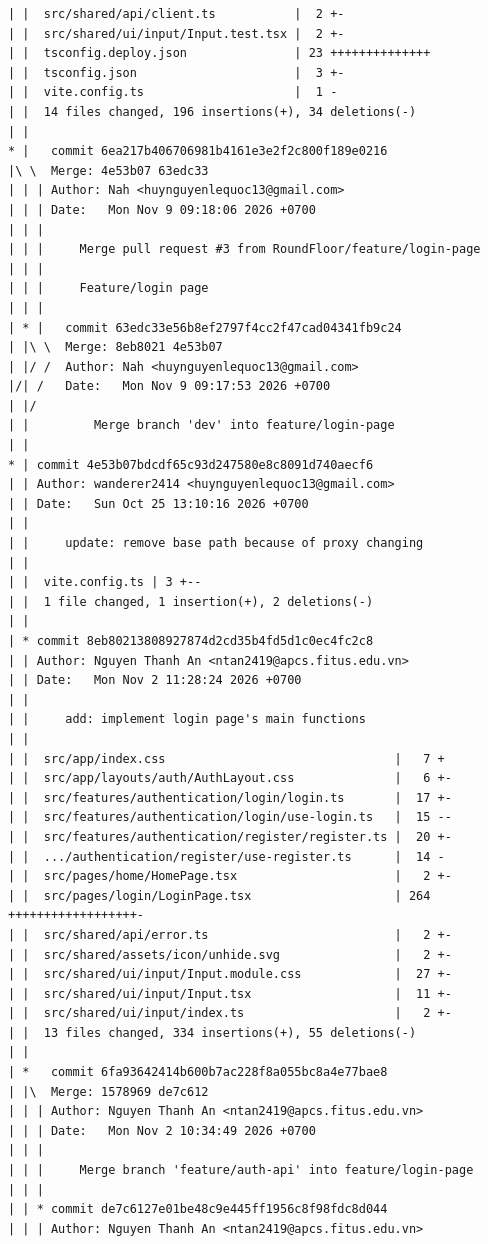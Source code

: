 \documentclass[12pt]{article}
\begin{document}
\begin{lstlisting}[numbers=none,breaklines=true]
| |  src/shared/api/client.ts           |  2 +-
| |  src/shared/ui/input/Input.test.tsx |  2 +-
| |  tsconfig.deploy.json               | 23 ++++++++++++++
| |  tsconfig.json                      |  3 +-
| |  vite.config.ts                     |  1 -
| |  14 files changed, 196 insertions(+), 34 deletions(-)
| |
* |   commit 6ea217b406706981b4161e3e2f2c800f189e0216
|\ \  Merge: 4e53b07 63edc33
| | | Author: Nah <huynguyenlequoc13@gmail.com>
| | | Date:   Mon Nov 9 09:18:06 2026 +0700
| | |
| | |     Merge pull request #3 from RoundFloor/feature/login-page
| | |
| | |     Feature/login page
| | |
| * |   commit 63edc33e56b8ef2797f4cc2f47cad04341fb9c24
| |\ \  Merge: 8eb8021 4e53b07
| |/ /  Author: Nah <huynguyenlequoc13@gmail.com>
|/| /   Date:   Mon Nov 9 09:17:53 2026 +0700
| |/
| |         Merge branch 'dev' into feature/login-page
| |
* | commit 4e53b07bdcdf65c93d247580e8c8091d740aecf6
| | Author: wanderer2414 <huynguyenlequoc13@gmail.com>
| | Date:   Sun Oct 25 13:10:16 2026 +0700
| |
| |     update: remove base path because of proxy changing
| |
| |  vite.config.ts | 3 +--
| |  1 file changed, 1 insertion(+), 2 deletions(-)
| |
| * commit 8eb80213808927874d2cd35b4fd5d1c0ec4fc2c8
| | Author: Nguyen Thanh An <ntan2419@apcs.fitus.edu.vn>
| | Date:   Mon Nov 2 11:28:24 2026 +0700
| |
| |     add: implement login page's main functions
| |
| |  src/app/index.css                                |   7 +
| |  src/app/layouts/auth/AuthLayout.css              |   6 +-
| |  src/features/authentication/login/login.ts       |  17 +-
| |  src/features/authentication/login/use-login.ts   |  15 --
| |  src/features/authentication/register/register.ts |  20 +-
| |  .../authentication/register/use-register.ts      |  14 -
| |  src/pages/home/HomePage.tsx                      |   2 +-
| |  src/pages/login/LoginPage.tsx                    | 264 ++++++++++++++++++-
| |  src/shared/api/error.ts                          |   2 +-
| |  src/shared/assets/icon/unhide.svg                |   2 +-
| |  src/shared/ui/input/Input.module.css             |  27 +-
| |  src/shared/ui/input/Input.tsx                    |  11 +-
| |  src/shared/ui/input/index.ts                     |   2 +-
| |  13 files changed, 334 insertions(+), 55 deletions(-)
| |
| *   commit 6fa93642414b600b7ac228f8a055bc8a4e77bae8
| |\  Merge: 1578969 de7c612
| | | Author: Nguyen Thanh An <ntan2419@apcs.fitus.edu.vn>
| | | Date:   Mon Nov 2 10:34:49 2026 +0700
| | |
| | |     Merge branch 'feature/auth-api' into feature/login-page
| | |
| | * commit de7c6127e01be48c9e445ff1956c8f98fdc8d044
| | | Author: Nguyen Thanh An <ntan2419@apcs.fitus.edu.vn>

\end{lstlisting}
\end{document}
